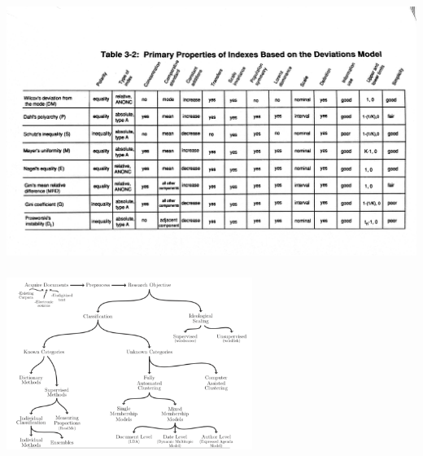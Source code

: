 \documentclass[aspectratio=169]{beamer}
\begin{document}
\begin{frame}
\frametitle{}

\begin{center}
\includegraphics[width=\textwidth]{figures/coulter_measuring_1989_tab3_2}
\end{center}

\end{frame}
\begin{frame}
\frametitle{}

\begin{center}
\includegraphics[width=0.6\textwidth]{figures/grimmer_text_2013_fig1}
\end{center}

\end{frame}
\end{document}
